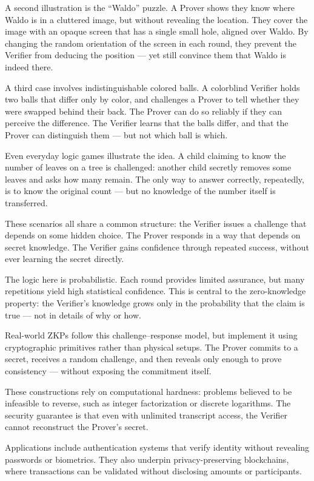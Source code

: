 A second illustration is the “Waldo” puzzle. A Prover shows they know where Waldo is in a cluttered image, but without revealing the location. They cover the image with an opaque screen that has a single small hole, aligned over Waldo. By changing the random orientation of the screen in each round, they prevent the Verifier from deducing the position — yet still convince them that Waldo is indeed there.

A third case involves indistinguishable colored balls. A colorblind Verifier holds two balls that differ only by color, and challenges a Prover to tell whether they were swapped behind their back. The Prover can do so reliably if they can perceive the difference. The Verifier learns that the balls differ, and that the Prover can distinguish them — but not which ball is which.

Even everyday logic games illustrate the idea. A child claiming to know the number of leaves on a tree is challenged: another child secretly removes some leaves and asks how many remain. The only way to answer correctly, repeatedly, is to know the original count — but no knowledge of the number itself is transferred.

These scenarios all share a common structure: the Verifier issues a challenge that depends on some hidden choice. The Prover responds in a way that depends on secret knowledge. The Verifier gains confidence through repeated success, without ever learning the secret directly.

The logic here is probabilistic. Each round provides limited assurance, but many repetitions yield high statistical confidence. This is central to the zero-knowledge property: the Verifier's knowledge grows only in the probability that the claim is true — not in details of why or how.

Real-world ZKPs follow this challenge–response model, but implement it using cryptographic primitives rather than physical setups. The Prover commits to a secret, receives a random challenge, and then reveals only enough to prove consistency — without exposing the commitment itself.

These constructions rely on computational hardness: problems believed to be infeasible to reverse, such as integer factorization or discrete logarithms. The security guarantee is that even with unlimited transcript access, the Verifier cannot reconstruct the Prover’s secret.

Applications include authentication systems that verify identity without revealing passwords or biometrics. They also underpin privacy-preserving blockchains, where transactions can be validated without disclosing amounts or participants.

